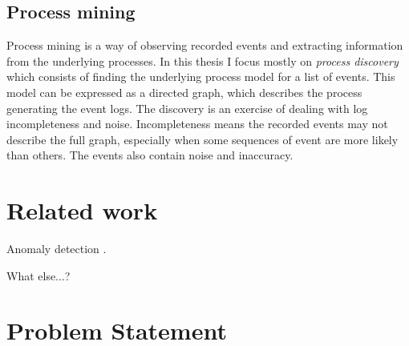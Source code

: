 \documentclass[english,12pt,a4paper,pdftex,sci,utf8]{aaltothesis}
\begin{document}

\subsection{Process mining}


Process mining is a way of observing recorded events and extracting information from the underlying processes.
In this thesis I focus mostly on \emph{process discovery} which consists of finding the underlying process model for a list of events. 
This model can be expressed as a directed graph, which describes the process generating the event logs. 
The discovery is an exercise of dealing with log incompleteness and noise.
Incompleteness means the recorded events may not describe the full graph, especially when some 
sequences of event are more likely than others. 
The events also contain noise and inaccuracy. \cite{van2013discovering}







\clearpage
\section{Related work}
\label{sec:relatedwork}

Anomaly detection \cite{bezerra2009anomaly}.

What else...?


\clearpage
\section{Problem Statement}
\label{sec:problem}


\end{document}
